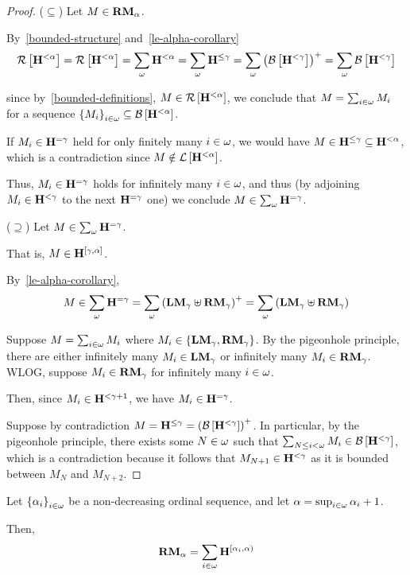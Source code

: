 \begin{proof}
  ($\subseteq$) Let $M \in \mathbf{RM}_{\alpha}$.

  By~\cref{bounded-structure} and~\cref{le-alpha-corollary}
  \[
    \mathcal{R} \left[ {\mathbf{H}^{< \alpha}} \right]
    = \mathcal{R} \left[ {\mathbf{H}^{< \alpha}} \right]
    = \sum_{\omega}{\mathbf{H}^{< \alpha}}
    = \sum_{\omega}{\mathbf{H}^{\le \gamma}}
    = \sum_{\omega}{\left( {\mathcal{B} \left[ {\mathbf{H}^{< \gamma}} \right]} \right)^+}
    = \sum_{\omega}{\mathcal{B} \left[ {\mathbf{H}^{< \gamma}} \right]}
  \]

  since by~\cref{bounded-definitions}, $M \in \mathcal{R} \left[ {\mathbf{H}^{< \alpha}} \right]$,
  we conclude that $M = \sum_{i \in \omega}{M_i}$ for a sequence
  $\left\{ {M_i} \right\}_{i \in \omega} \subseteq \mathcal{B} \left[ {\mathbf{H}^{< \alpha}} \right]$.

  If $M_i \in \mathbf{H}^{= \gamma}$ held for only finitely many $i \in \omega$,
  we would have $M \in \mathbf{H}^{\le \gamma} \subseteq \mathbf{H}^{< \alpha}$, which is a contradiction
  since $M \notin \mathcal{L} \left[ {\mathbf{H}^{< \alpha}} \right]$.

  Thus, $M_i \in \mathbf{H}^{= \gamma}$ holds
  for infinitely many $i \in \omega$, and thus (by adjoining $M_i \in \mathbf{H}^{< \gamma}$
  to the next $\mathbf{H}^{= \gamma}$ one) we conclude $M \in \sum_{\omega}{\mathbf{H}^{= \gamma}}$.

  ($\supseteq$) Let $M \in \sum_{\omega}{\mathbf{H}^{= \gamma}}$.

  That is, $M \in \mathbf{H}^{[\gamma, \alpha]}$.

  By~\cref{le-alpha-corollary},
  \[
    M \in \sum_{\omega}{\mathbf{H}^{= \gamma}}
    = \sum_{\omega} \left( { \mathbf{LM}_{\gamma} \uplus \mathbf{RM}_{\gamma} } \right)^+
    = \sum_{\omega} \left( { \mathbf{LM}_{\gamma} \uplus \mathbf{RM}_{\gamma} } \right)
  \]

  Suppose $M = \sum_{i \in \omega}{M_i}$ where $M_i \in \left\{ {\mathbf{LM}_{\gamma}, \mathbf{RM}_{\gamma}} \right\}$.
  By the pigeonhole principle, there are either
  infinitely many $M_i \in \mathbf{LM}_{\gamma}$ or infinitely many $M_i \in \mathbf{RM}_{\gamma}$.
  WLOG, suppose $M_i \in \mathbf{RM}_{\gamma}$ for infinitely many $i \in \omega$.

  Then, since $M_i \in \mathbf{H}^{< \gamma + 1}$, we have $M_i \in \mathbf{H}^{= \gamma}$.

  Suppose by contradiction $M = \mathbf{H}^{\le \gamma} = \left( {\mathcal{B} \left[ {\mathbf{H}^{< \gamma}} \right]} \right)^+$.
  In particular, by the pigeonhole principle, there exists some $N \in \omega$
  such that $\sum_{N \le i < \omega} M_i \in \mathcal{B} \left[ {\mathbf{H}^{< \gamma}} \right]$,
  which is a contradiction because it follows that $M_{N+1} \in \mathbf{H}^{< \gamma}$ as it is bounded
  between $M_N$ and $M_{N+2}$.
\end{proof}

\begin{lemma}\label{rmj-limit-decomposition}
  Let $\left\{ {\alpha_i} \right\}_{i \in \omega}$ be a non-decreasing ordinal sequence, and let $\alpha = \sup_{i \in \omega} {\alpha_i + 1}$.

  Then,
  \[
    \mathbf{RM}_{\alpha} = \sum_{i \in \omega}{\mathbf{H}^{[\alpha_i, \alpha)}}
  \]
\end{lemma}

